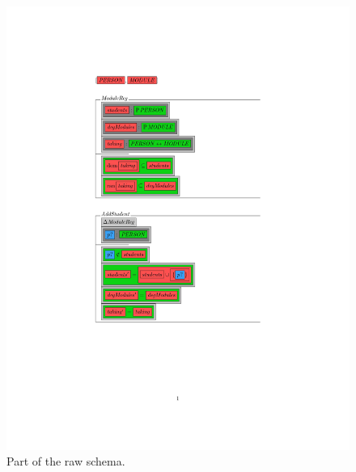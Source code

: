 \begin{figure}[H]
\begin{minipage}{0.45\textwidth}
\begin{tiny}
\begin{BVerbatim}[commandchars=+\[\]]
\end{BVerbatim}
\end{tiny}
\vspace{-0.2in}
\caption{Part of the raw schema.\label{fig:zcgaschema}}
\vspace{-0.2in}
\end{minipage}\hfill
\begin{minipage}{0.45\textwidth}
\centering
\centering
\includegraphics[clip, trim=5.5cm 8cm 9.5cm 4cm, width=1.00\textwidth]{Figures/fullexample/1.jpg}

\end{minipage}
\end{figure}
